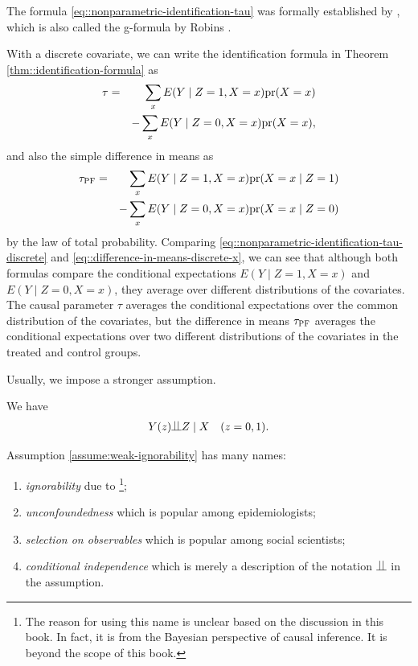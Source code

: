  
 The formula \eqref{eq::nonparametric-identification-tau} was formally established by \citet{rosenbaum1983central}, which is also called the g-formula by Robins \citep[see][]{hernan2020causal}.
 
 
 With a discrete covariate, we can write the identification formula in Theorem \ref{thm::identification-formula} as 
\begin{eqnarray}
 \tau  &=&  \sum_x  E(Y\mid Z=1, X=x)  \pr(X=x)  \nonumber \\
 &&  - \sum_x E(Y\mid Z=0, X=x) \pr(X=x), \label{eq::nonparametric-identification-tau-discrete}
\end{eqnarray}
 and also the simple difference in means as
  \begin{eqnarray}  
 \tau_\textsc{PF} &=& \sum_x   E(Y\mid Z=1, X=x) \pr(X=x\mid Z=1) \nonumber  \\
 &&- \sum_x   E(Y\mid Z=0, X=x) \pr(X=x\mid Z=0)  \label{eq::difference-in-means-discrete-x}
  \end{eqnarray} 
 by the law of total probability. Comparing \eqref{eq::nonparametric-identification-tau-discrete} and \eqref{eq::difference-in-means-discrete-x}, we can see that although both formulas compare the conditional expectations $ E(Y\mid Z=1, X=x) $ and $ E(Y\mid Z=0, X=x)$, they average over different distributions of the covariates. The causal parameter $\tau$ averages the conditional expectations over the common distribution of the covariates, but the difference in means $ \tau_\textsc{PF} $ averages the conditional expectations over two different distributions of the covariates in the treated and control groups. 
 
 
 
 Usually, we impose a stronger assumption.
 
 \begin{assumption}[ignorability]
 \label{assume:weak-ignorability} 
 We have 
 \begin{eqnarray}
 Y(z) \ind Z \mid X \quad (z=0,1) .
 \label{eq::ignorability}
\end{eqnarray}
 \end{assumption}
 
 
Assumption \ref{assume:weak-ignorability} has many names:
\begin{enumerate}
\item
{\it ignorability}  due to \citet{rubin1978bayesian}\footnote{The reason for using this name is unclear based on the discussion in this book. In fact, it is from the Bayesian perspective of causal inference. It is beyond the scope of this book.};

\item
{\it unconfoundedness} which is popular among epidemiologists;

\item
{\it selection on observables} which is popular among social scientists;

\item
{\it conditional independence} which is merely a description of the notation $\ind$ in the assumption.
\end{enumerate}


